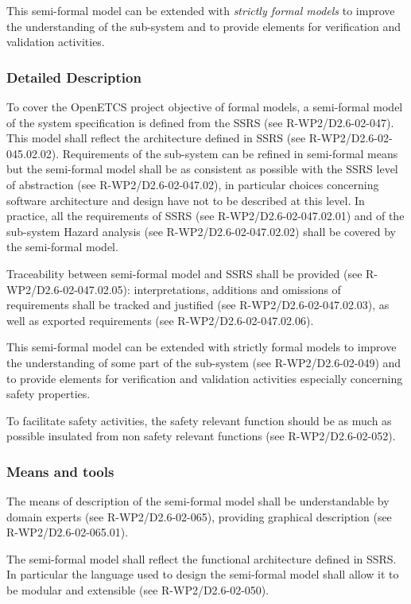 This semi-formal model can be extended with \textit{strictly formal models} to improve the understanding of the sub-system and to provide elements for verification and validation activities.

\subsubsection{Detailed Description}
\label{sec:sys-dev-deta-descr}


To cover the OpenETCS project objective  of formal models, a semi-formal model of the system  specification is defined from  the SSRS (see R-WP2/D2.6-02-047). This model shall reflect the architecture defined in SSRS (see R-WP2/D2.6-02-045.02.02). Requirements of the sub-system can be refined in semi-formal means but the semi-formal model  shall be as consistent as possible with the SSRS level of abstraction (see R-WP2/D2.6-02-047.02), in particular choices concerning software architecture and design have not to be described at this level.
In practice, all the requirements of SSRS (see R-WP2/D2.6-02-047.02.01) and of the sub-system Hazard analysis (see R-WP2/D2.6-02-047.02.02) shall be covered by the semi-formal model.

Traceability between semi-formal model and SSRS shall be provided (see R-WP2/D2.6-02-047.02.05): interpretations, additions and omissions of requirements shall be tracked and justified (see R-WP2/D2.6-02-047.02.03), as well as exported requirements  (see R-WP2/D2.6-02-047.02.06).

This semi-formal model can be extended with strictly formal models to improve the understanding of some part of the sub-system (see R-WP2/D2.6-02-049) and to  provide elements for verification and validation activities especially concerning safety properties.

To facilitate safety activities, the safety relevant function should be as much as possible insulated from non safety relevant functions (see R-WP2/D2.6-02-052).


\subsubsection{Means and tools}

The means of description of the semi-formal model shall be understandable by domain experts (see R-WP2/D2.6-02-065), providing graphical  description (see R-WP2/D2.6-02-065.01).

The semi-formal model shall reflect the functional architecture defined in SSRS. In particular the language used to  design the semi-formal model shall allow it to be modular and extensible (see R-WP2/D2.6-02-050).

